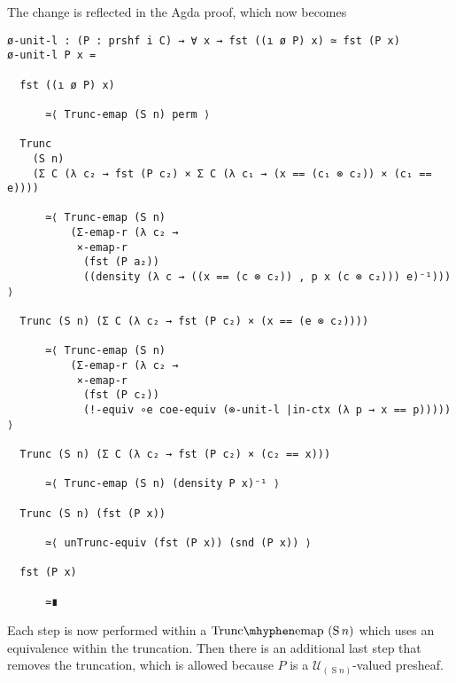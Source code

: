 \documentclass[12pt, parskip, DIV=14]{scrbook}
\newcommand{\Suc}{\operatorname{S}}
\begin{document}
The change is reflected in the Agda proof, which now becomes
\begin{verbatim}
ø-unit-l : (P : prshf i C) → ∀ x → fst ((ı ø P) x) ≃ fst (P x)
ø-unit-l P x =

  fst ((ı ø P) x)

      ≃⟨ Trunc-emap (S n) perm ⟩

  Trunc
    (S n)
    (Σ C (λ c₂ → fst (P c₂) × Σ C (λ c₁ → (x == (c₁ ⊗ c₂)) × (c₁ == e))))

      ≃⟨ Trunc-emap (S n)
          (Σ-emap-r (λ c₂ →
           ×-emap-r
            (fst (P a₂))
            ((density (λ c → ((x == (c ⊗ c₂)) , p x (c ⊗ c₂))) e)⁻¹))) ⟩

  Trunc (S n) (Σ C (λ c₂ → fst (P c₂) × (x == (e ⊗ c₂))))

      ≃⟨ Trunc-emap (S n)
          (Σ-emap-r (λ c₂ →
           ×-emap-r
            (fst (P c₂))
            (!-equiv ∘e coe-equiv (⊗-unit-l |in-ctx (λ p → x == p))))) ⟩

  Trunc (S n) (Σ C (λ c₂ → fst (P c₂) × (c₂ == x)))

      ≃⟨ Trunc-emap (S n) (density P x)⁻¹ ⟩

  Trunc (S n) (fst (P x))

      ≃⟨ unTrunc-equiv (fst (P x)) (snd (P x)) ⟩

  fst (P x)

      ≃∎
\end{verbatim}

Each step is now performed within a $\mathrm{Trunc\mhyphen emap}~(\Suc n)$ which uses an equivalence within the truncation. Then there is an additional last step that removes the truncation, which is allowed because $P$ is a $\mathcal{U}_{(\Suc n)}$-valued presheaf.

%
\end{document}
